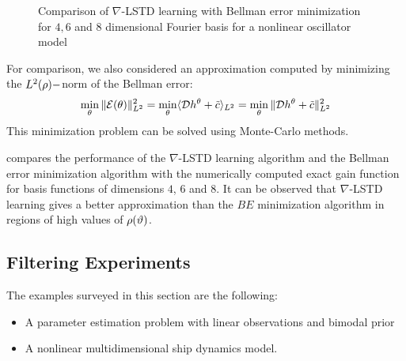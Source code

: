 \begin{figure}
	\caption{Comparison of $\nabla$-LSTD learning with Bellman error minimization for $4,6$ and $8$ dimensional Fourier basis for a nonlinear oscillator model}
	\label{fig:gain_nl_oscillator}
\end{figure}

For comparison, we also considered an approximation computed by minimizing the $L^2(\rho)-$norm of the Bellman error:
\begin{align}
\min_{\param}\|\clE(\param)\|_{L^2}^{2}=\min_{\param}\langle \clD h^\param + \tilc \rangle_{L^2} = \min_{\param}\|\clD h^\param +\tilc \|_{L^2}^{2}
\label{e:fpf_nl_be}
\end{align}
This minimization problem can be solved using Monte-Carlo methods.

 compares the performance of the $\nabla$-LSTD learning algorithm and the Bellman error minimization algorithm with the numerically computed exact gain function for basis functions of dimensions $4$, $6$ and $8$. It can be observed that $\nabla$-LSTD learning gives a better approximation than the $BE$ minimization algorithm in regions of high values of $\rho(\vartheta)$.

\subsection{Filtering Experiments}
\label{s:filtering_experiments}
The examples surveyed in this section are the following:
\begin{itemize}
	\item A parameter estimation problem with linear observations and bimodal prior
	\item A nonlinear multidimensional ship dynamics model.
\end{itemize}
